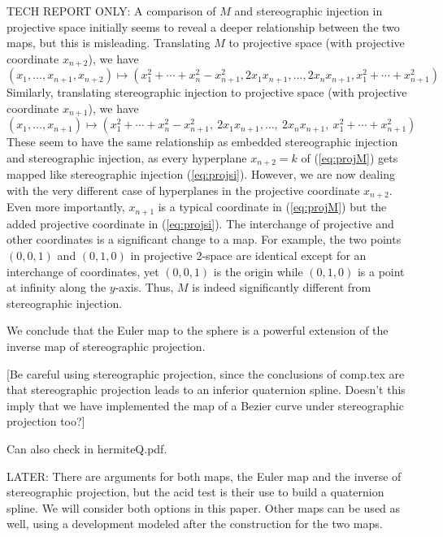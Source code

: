 \documentclass[11pt]{article}
\begin{document}
TECH REPORT ONLY:
A comparison of $M$ and stereographic injection in projective space initially 
seems to reveal a deeper relationship between the two maps,
but this is misleading.
Translating $M$ to projective space (with projective coordinate $x_{n+2}$), 
we have
\begin{equation}
\label{eq:projM}
(x_1,\ldots,x_{n+1},x_{n+2}) \mapsto 
	(x_1^2 + \cdots + x_{n}^2 - x_{n+1}^2,
	 2x_1x_{n+1}, \ldots, 2x_nx_{n+1}, x_1^2 + \cdots + x_{n+1}^2)
\end{equation}
Similarly, translating stereographic injection to projective space 
(with projective coordinate $x_{n+1}$), we have
\begin{equation}
\label{eq:projsi}
	(x_1,\ldots,x_{n+1}) \mapsto
	(x_1^2 + \cdots + x_n^2 - x_{n+1}^2,\ 2x_{1}x_{n+1}, \ldots,\ 2x_{n}x_{n+1},\ 
	x_1^2 + \cdots + x_{n+1}^2)
\end{equation}
These seem to have the same relationship as embedded stereographic
injection and stereographic injection,
as every hyperplane $x_{n+2}=k$ of (\ref{eq:projM}) gets mapped 
like stereographic injection (\ref{eq:projsi}).
However, we are now dealing with the very different case of 
hyperplanes in the projective coordinate $x_{n+2}$.
Even more importantly, $x_{n+1}$ is a typical %
coordinate in (\ref{eq:projM}) but the added projective coordinate in (\ref{eq:projsi}).
The interchange of projective and other coordinates is a significant
change to a map. %
For example, the two points $(0,0,1)$ and $(0,1,0)$ in projective 2-space
are identical except for an interchange of coordinates,
yet $(0,0,1)$ is the origin while $(0,1,0)$ is a point at infinity
along the $y$-axis.
Thus, $M$ is indeed significantly different from stereographic injection.

We conclude that the Euler map to the sphere is a powerful extension of
the inverse map of stereographic projection.

[Be careful using stereographic projection, since the conclusions of comp.tex are that
stereographic projection leads to an inferior quaternion spline.
Doesn't this imply that we have implemented the map of a Bezier curve under
stereographic projection too?]

Can also check in hermiteQ.pdf.

LATER:
There are arguments for both maps, the Euler map and the inverse of stereographic
projection, but the acid test is their use to build a quaternion spline.
We will consider both options in this paper.
Other maps can be used as well, using a development modeled after the construction
for the two maps.
\end{document}
